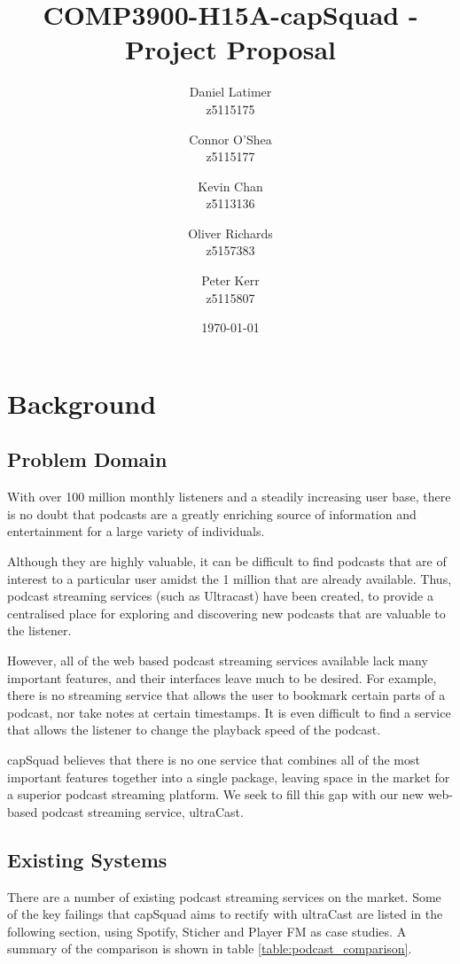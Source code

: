 \documentclass[12pt]{article}
\title{COMP3900-H15A-capSquad - Project Proposal}
\date{\today}
\author{
    Daniel Latimer \\ z5115175 \and
    Connor O'Shea \\ z5115177 \and
    Kevin Chan \\ z5113136 \and
    Oliver Richards \\ z5157383 \and
    Peter Kerr \\ z5115807}
\begin{document}
\maketitle
\tableofcontents
\newpage

\section{Background}
\subsection{Problem Domain}
With over 100 million monthly listeners\cite{musicoomph} and a steadily increasing user base, there is no doubt that podcasts are a greatly enriching source of information and entertainment for a large variety of individuals.

Although they are highly valuable, it can be difficult to find podcasts that are of interest to a particular user amidst the 1 million\cite{musicoomph} that are already available.
Thus, podcast streaming services (such as Ultracast) have been created, to provide a centralised place for exploring and discovering new podcasts that are valuable to the listener.

However, all of the web based podcast streaming services available lack many important features, and their interfaces leave much to be desired. For example, there is no streaming service that allows the user to bookmark certain parts of a podcast, nor take notes at certain timestamps. It is even difficult to find a service that allows the listener to change the playback speed of the podcast.

capSquad believes that there is no one service that combines all of the most important features together into a single package, leaving space in the market for a superior podcast streaming platform. We seek to fill this gap with our new web-based podcast streaming service, ultraCast.

\subsection{Existing Systems}

There are a number of existing podcast streaming services on the market. Some of the key failings that capSquad aims to rectify with ultraCast are listed in the following section, using Spotify\cite{spotify}, Sticher\cite{sticher} and Player FM\cite{player_fm} as case studies.
A summary of the comparison is shown in table \ref{table:podcast_comparison}.
\end{document}
